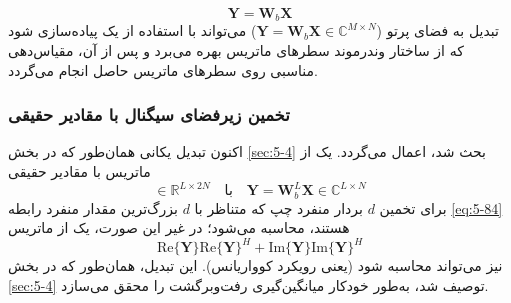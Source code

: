 \begin{equation}
	\bm{Y} = \bm{W}_b \bm{X}
	\label{eq:5-83}
\end{equation}
تبدیل به فضای پرتو  ($\bm{Y} = \bm{W}_b \bm{X} \in \mathbb{C}^{M \times N}$) می‌تواند با استفاده از یک  پیاده‌سازی شود که از ساختار وندرموند سطرهای ماتریس  بهره می‌برد و پس از آن، مقیاس‌دهی مناسبی روی سطرهای ماتریس حاصل انجام می‌گردد.

\subsubsection{تخمین زیرفضای سیگنال با مقادیر حقیقی}
\label{subsubsec:5-7-1-2}
اکنون تبدیل یکانی همان‌طور که در بخش \ref{sec:5-4} بحث شد، اعمال می‌گردد. یک  از ماتریس با مقادیر حقیقی
\begin{equation}
	[\text{Re}\{\bm{Y}\} \quad \text{Im}\{\bm{Y}\}] \in \mathbb{R}^{L \times 2N} \quad \text{با} \quad \bm{Y} = \bm{W}_b^L \bm{X} \in \mathbb{C}^{L \times N}
	\label{eq:5-84}
\end{equation}
برای تخمین $d$ بردار منفرد چپ که متناظر با $d$ بزرگ‌ترین مقدار منفرد رابطه \eqref{eq:5-84} هستند، محاسبه می‌شود؛ در غیر این صورت، یک  از ماتریس
\begin{equation}
	\text{Re}\{\bm{Y}\} \text{Re}\{\bm{Y}\}^H + \text{Im}\{\bm{Y}\} \text{Im}\{\bm{Y}\}^H
	\label{eq:5-85}
\end{equation}
نیز می‌تواند محاسبه شود (یعنی رویکرد کوواریانس). این تبدیل، همان‌طور که در بخش \ref{sec:5-4} توصیف شد، به‌طور خودکار میانگین‌گیری رفت‌وبرگشت را محقق می‌سازد.



































